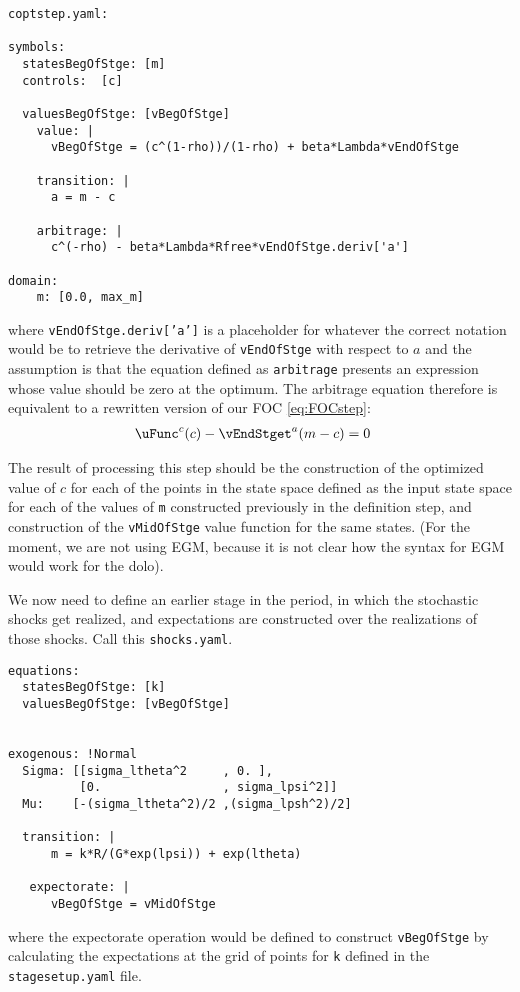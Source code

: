 \documentclass[SolvingMicroDSOPs]{subfiles}
\begin{document}
\begin{verbatim}
coptstep.yaml:

symbols:
  statesBegOfStge: [m]
  controls:  [c]

  valuesBegOfStge: [vBegOfStge]
    value: |
      vBegOfStge = (c^(1-rho))/(1-rho) + beta*Lambda*vEndOfStge

    transition: |
      a = m - c

    arbitrage: |
      c^(-rho) - beta*Lambda*Rfree*vEndOfStge.deriv['a'] 

domain:
    m: [0.0, max_m]

\end{verbatim}
where \texttt{vEndOfStge.deriv['a']} is a placeholder for whatever the correct notation would be to retrieve the derivative of \texttt{vEndOfStge} with respect to $a$ and the assumption is that the equation defined as \texttt{arbitrage} presents an expression whose value should be zero at the optimum.  The arbitrage equation therefore is equivalent to a rewritten version of our FOC \eqref{eq:FOCstep}:
\begin{align}
  \uFunc^{{c}}(c) - \vEndStget^{{a}}(m-c) & = 0
\end{align}

The result of processing this step should be the construction of the optimized value of $c$ for each of the points in the state space defined as the input state space for each of the values of \texttt{m} constructed previously in the definition step, and construction of the \texttt{vMidOfStge} value function for the same states. (For the moment, we are not using EGM, because it is not clear how the syntax for EGM would work for the dolo).

We now need to define an earlier stage in the period, in which the stochastic shocks get realized, and expectations are constructed over the realizations of those shocks.  Call this \texttt{shocks.yaml}.

\begin{verbatim}
equations:
  statesBegOfStge: [k]
  valuesBegOfStge: [vBegOfStge]


exogenous: !Normal
  Sigma: [[sigma_ltheta^2     , 0. ],
          [0.                 , sigma_lpsi^2]]
  Mu:    [-(sigma_ltheta^2)/2 ,(sigma_lpsh^2)/2]

  transition: |
      m = k*R/(G*exp(lpsi)) + exp(ltheta)

   expectorate: |
      vBegOfStge = vMidOfStge
\end{verbatim}
where the expectorate operation would be defined to construct \texttt{vBegOfStge} by calculating the expectations at the grid of points for \texttt{k} defined in the \texttt{stagesetup.yaml} file.
\end{document}
